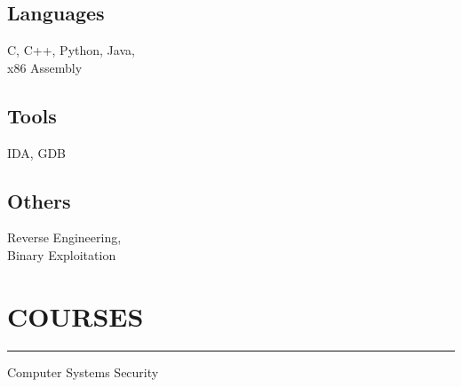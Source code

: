 \documentclass[]{resume}
\begin{document}
\begin{minipage}[t]{0.33\textwidth}
    \vspace{6pt}
    \subsection{Languages}
    \noindent C, C++, Python, Java,\\
    x86 Assembly

    \vspace{6pt}
    \subsection{Tools}
    \noindent IDA, GDB

    \vspace{6pt}
    \subsection{Others}
    \noindent Reverse Engineering,\\
    Binary Exploitation


    \section{COURSES}
    \noindent\rule{5cm}{0.4pt}

    \noindent Computer Systems Security\\
    \noindent {}\\

\end{minipage}

%
%
\end{document}
